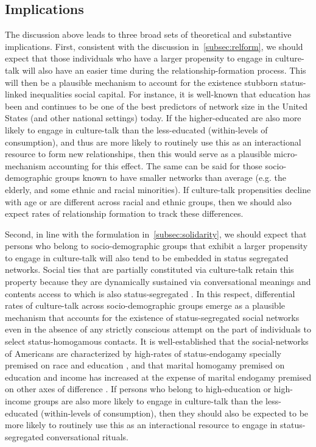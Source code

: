 \subsection{Implications}
\label{subec:implications}

The discussion above leads to three broad sets of theoretical and substantive implications.  First, consistent with the discussion in~\ref{subsec:relform}, we should expect that those individuals who have a larger propensity to engage in culture-talk will also have an easier time during the relationship-formation process.  This will then be a plausible mechanism to account for the existence stubborn status-linked inequalities social capital.  For instance, it is well-known that education has been \citep{fischer82, marsden87} and continues to be \citep{lizardo06a, diprete_etal11} one of the best predictors of network size in the United States (and other national settings) today.  If the higher-educated are also more likely to engage in culture-talk than the less-educated (within-levels of consumption), and thus are more likely to routinely use this as an interactional resource to form new relationships, then this would serve as a plausible micro-mechanism accounting for this effect.  The same can be said for those socio-demographic groups known to have smaller networks than average (e.g. the elderly, and some ethnic and racial minorities).  If culture-talk propensities decline with age or are different across racial and ethnic groups, then we should also expect rates of relationship formation to track these differences.

Second, in line with the formulation in~\ref{subsec:solidarity}, we should expect that persons who belong to socio-demographic groups that exhibit a larger propensity to engage in culture-talk will also tend to be embedded in status segregated networks.   Social ties that are partially constituted via culture-talk retain this property because they are dynamically sustained via conversational meanings and contents access to which is also status-segregated \citep{bourdieu84}.   In this respect, differential rates of culture-talk across socio-demographic groups emerge as a plausible mechanism that accounts for the existence of status-segregated social networks even in the absence of any strictly conscious attempt on the part of individuals to select status-homogamous contacts.   It is well-established that the social-networks of Americans are characterized by high-rates of status-endogamy specially premised on race and education \citep{fischer82, marsden87, mcpherson_etal06, diprete_etal11}, and that marital homogamy premised on education and income has increased at the expense of marital endogamy premised on other axes of difference \citep{kalmijn91, kalmijn94, schwartz_mare05, schwartz10}.  If persons who belong to high-education or high-income groups are also more likely to engage in culture-talk than the less-educated (within-levels of consumption), then they should also be expected to be more likely to routinely use this as an interactional resource to engage in status-segregated conversational rituals.

